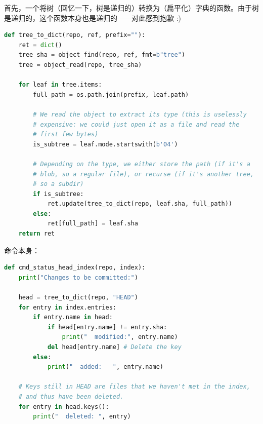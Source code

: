 \documentclass{ctexart}
\theoremstyle{remark}
\theoremstyle{warningstyle}
\theoremstyle{warningstyle}
\begin{document}
首先，一个将树（回忆一下，树是递归的）转换为（扁平化）字典的函数。由于树是递归的，这个函数本身也是递归的——对此感到抱歉 :)
\begin{lstlisting}[language=Python]
def tree_to_dict(repo, ref, prefix=""):
    ret = dict()
    tree_sha = object_find(repo, ref, fmt=b"tree")
    tree = object_read(repo, tree_sha)

    for leaf in tree.items:
        full_path = os.path.join(prefix, leaf.path)

        # We read the object to extract its type (this is uselessly
        # expensive: we could just open it as a file and read the
        # first few bytes)
        is_subtree = leaf.mode.startswith(b'04')

        # Depending on the type, we either store the path (if it's a
        # blob, so a regular file), or recurse (if it's another tree,
        # so a subdir)
        if is_subtree:
            ret.update(tree_to_dict(repo, leaf.sha, full_path))
        else:
            ret[full_path] = leaf.sha
    return ret
\end{lstlisting}
命令本身：
\begin{lstlisting}[language=Python]
def cmd_status_head_index(repo, index):
    print("Changes to be committed:")

    head = tree_to_dict(repo, "HEAD")
    for entry in index.entries:
        if entry.name in head:
            if head[entry.name] != entry.sha:
                print("  modified:", entry.name)
            del head[entry.name] # Delete the key
        else:
            print("  added:   ", entry.name)

    # Keys still in HEAD are files that we haven't met in the index,
    # and thus have been deleted.
    for entry in head.keys():
        print("  deleted: ", entry)
\end{lstlisting}
\end{document}
